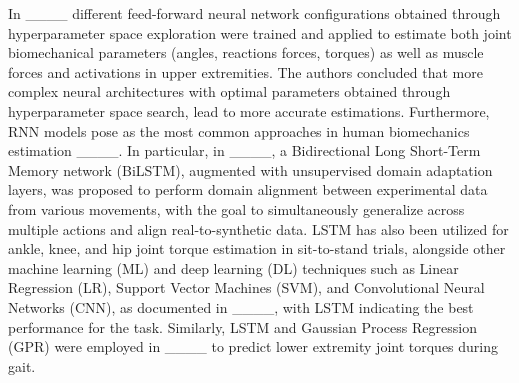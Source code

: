 In ____ different feed-forward neural network configurations obtained through hyperparameter space exploration were trained and applied to estimate both joint biomechanical parameters (angles, reactions forces, torques) as well as muscle forces and activations in upper extremities. The authors concluded that more complex neural architectures with optimal parameters obtained through hyperparameter space search, lead to more accurate estimations. Furthermore, RNN models pose as the most common approaches in human biomechanics estimation ____. %
In particular, in ____, a Bidirectional Long Short-Term Memory network (BiLSTM), augmented with unsupervised domain adaptation layers, was proposed to perform domain alignment between experimental data from various movements, with the goal to simultaneously generalize across multiple actions and align real-to-synthetic data. 
LSTM has also been utilized for ankle, knee, and hip joint torque estimation in sit-to-stand trials, alongside other machine learning (ML) and deep learning (DL) techniques such as Linear Regression (LR), Support Vector Machines (SVM), and Convolutional Neural Networks (CNN), as documented in ____, with LSTM indicating the best performance for the task. Similarly, LSTM and Gaussian Process Regression (GPR) were employed in ____ to predict lower extremity joint torques during gait. 


